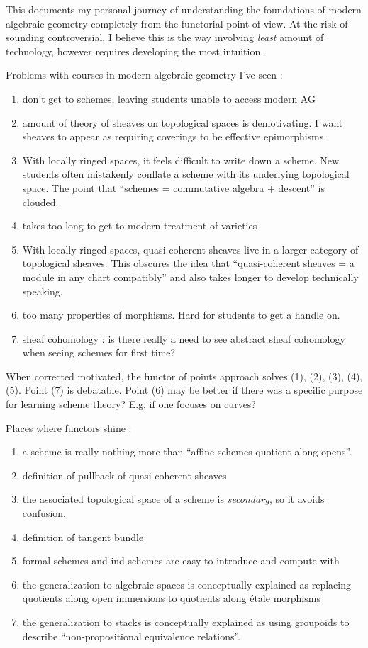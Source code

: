 \documentclass[./main.tex]{subfiles}
\begin{document}
This documents my personal journey of understanding the foundations of
modern algebraic geometry completely from the functorial point of view.
At the risk of sounding controversial,
I believe this is the way involving \emph{least} amount of technology,
however requires developing the most intuition.

Problems with courses in modern algebraic geometry I've seen :
\begin{enumerate}
  \item don't get to schemes, leaving students unable to access 
  modern AG
  \item amount of theory of sheaves on topological spaces
  is demotivating.
  I want sheaves to appear as
  requiring coverings to be effective epimorphisms.
  \item With locally ringed spaces, it feels difficult to write down
  a scheme. 
  New students often mistakenly conflate 
  a scheme with its underlying topological space.
  The point that ``schemes = commutative algebra + descent''
  is clouded.
  \item takes too long to get to modern treatment of varieties
  \item With locally ringed spaces,
  quasi-coherent sheaves live in a larger category of topological sheaves.
  This obscures the idea that
  ``quasi-coherent sheaves = a module in any chart compatibly''
  and also takes longer to develop technically speaking.
  \item too many properties of morphisms. 
  Hard for students to get a handle on.
  \item sheaf cohomology : is there really a need to see
  abstract sheaf cohomology when seeing schemes for first time?
\end{enumerate}
When corrected motivated,
the functor of points approach solves (1), (2), (3), (4), (5).
Point (7) is debatable. 
Point (6) may be better if there was a specific purpose for
learning scheme theory?
E.g. if one focuses on curves?

Places where functors shine : 
\begin{enumerate}
  \item a scheme is really nothing more than 
  ``affine schemes quotient along opens''.
  \item definition of pullback of quasi-coherent sheaves
  \item the associated topological space of a scheme is \emph{secondary},
  so it avoids confusion.
  \item definition of tangent bundle
  \item formal schemes and ind-schemes are easy to introduce
  and compute with
  \item the generalization to algebraic spaces
  is conceptually explained as replacing quotients along
  open immersions to quotients along étale morphisms
  \item the generalization to stacks is conceptually explained
  as using groupoids to describe ``non-propositional equivalence relations''.
\end{enumerate}
\end{document}
